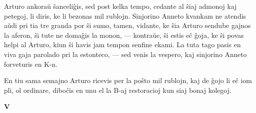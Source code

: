    Arturo ankora\u u \^sanceli\^gis, sed post kelka tempo, cedante al \^siaj
admonoj kaj petegoj, li diris, ke li bezonas mil rublojn. Sinjorino
Anneto kvankam ne atendis a\u udi pri tia tre granda por \^si sumo,
tamen, vidante, ke \^sia Arturo sendube gajnos la aferon, \^si tute
ne doma\^gis la monon, --- kontra\u ue, \^si estis e\^c \^goja, ke
\^si povas helpi al Arturo, kiun \^si havis jam tempon senfine
ekami. La tuta tago pasis en viva gaja parolado pri la estonteco,
--- sed venis la vespero, kaj sinjorino Anneto forveturis en K-n.

   En tiu sama semajno Arturo ricevis per la po\^sto mil rublojn, kaj
de \^gojo li e\^c iom pli, ol ordinare, dibo\^cis en unu el la B-aj
restoracioj kun siaj bonaj kolegoj.

\begin{center}
\textbf{V}
\end{center}

